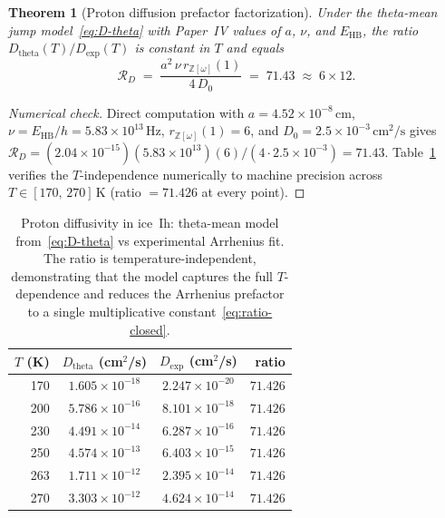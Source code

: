 \documentclass[11pt,letterpaper]{article}
\theoremstyle{plain}
\newtheorem{theorem}{Theorem}[section]
\theoremstyle{definition}
\newcommand{\Eisenstein}{\mathbb{Z}[\omega]}
\begin{document}
\begin{theorem}[Proton diffusion prefactor factorization]
\label{thm:diff-prefactor}
Under the theta-mean jump model~\eqref{eq:D-theta} with Paper~IV
values of $a$, $\nu$, and $E_{\text{HB}}$, the ratio
$D_{\text{theta}}(T)/D_{\text{exp}}(T)$ is \emph{constant in $T$}
and equals
\begin{equation}\label{eq:ratio-closed}
  \mathcal{R}_D \;=\; \frac{a^2\,\nu\,r_{\Eisenstein}(1)}{4\,D_0}
                 \;=\; 71.43 \;\approx\; 6\times 12.
\end{equation}
\end{theorem}

\begin{proof}[Numerical check]
Direct computation with $a=4.52\times 10^{-8}\,\text{cm}$,
$\nu = E_{\text{HB}}/h = 5.83\times 10^{13}\,\text{Hz}$,
$r_{\Eisenstein}(1)=6$, and
$D_0=2.5\times 10^{-3}\,\text{cm}^2/\text{s}$ gives
$\mathcal{R}_D = (2.04\times 10^{-15})(5.83\times 10^{13})(6)/(4\cdot
2.5\times 10^{-3}) = 71.43$.  Table~\ref{tab:diff} verifies the
$T$-independence numerically to machine precision across
$T\in[170,\,270]\,\text{K}$ (ratio $= 71.426$ at every point).
\end{proof}

\begin{table}[ht]
\centering
\begin{tabular}{rccr}
\toprule
$T$ (K) & $D_{\text{theta}}$ (cm$^2$/s) & $D_{\text{exp}}$ (cm$^2$/s) & ratio \\
\midrule
170 & $1.605\times 10^{-18}$ & $2.247\times 10^{-20}$ & $71.426$ \\
200 & $5.786\times 10^{-16}$ & $8.101\times 10^{-18}$ & $71.426$ \\
230 & $4.491\times 10^{-14}$ & $6.287\times 10^{-16}$ & $71.426$ \\
250 & $4.574\times 10^{-13}$ & $6.403\times 10^{-15}$ & $71.426$ \\
263 & $1.711\times 10^{-12}$ & $2.395\times 10^{-14}$ & $71.426$ \\
270 & $3.303\times 10^{-12}$ & $4.624\times 10^{-14}$ & $71.426$ \\
\bottomrule
\end{tabular}
\caption{Proton diffusivity in ice~Ih: theta-mean model
from~\eqref{eq:D-theta} vs experimental Arrhenius fit.  The ratio
is temperature-independent, demonstrating that the model captures
the full $T$-dependence and reduces the Arrhenius prefactor to a
single multiplicative constant~\eqref{eq:ratio-closed}.}
\label{tab:diff}
\end{table}
\end{document}
